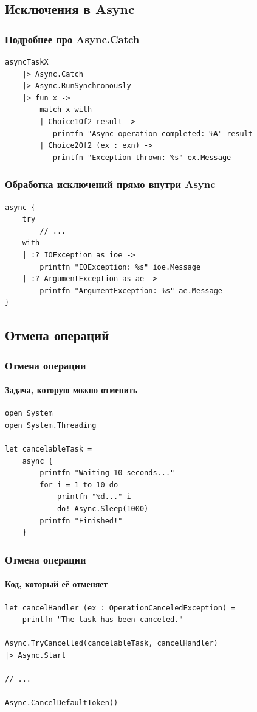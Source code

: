 \documentclass{../../slides-style}
\begin{document}
    \subsection{Исключения в Async}

    \begin{frame}[fragile]
        \frametitle{Подробнее про Async.Catch}
        \begin{verbatim}
asyncTaskX
    |> Async.Catch
    |> Async.RunSynchronously
    |> fun x ->
        match x with
        | Choice1Of2 result -> 
           printfn "Async operation completed: %A" result
        | Choice2Of2 (ex : exn) -> 
           printfn "Exception thrown: %s" ex.Message
        \end{verbatim}
    \end{frame}
    
    \begin{frame}[fragile]
        \frametitle{Обработка исключений прямо внутри Async}
        \begin{verbatim}
async {
    try
        // ...
    with
    | :? IOException as ioe ->
        printfn "IOException: %s" ioe.Message
    | :? ArgumentException as ae ->
        printfn "ArgumentException: %s" ae.Message
}
        \end{verbatim}
    \end{frame}

    \subsection{Отмена операций}

    \begin{frame}[fragile]
        \frametitle{Отмена операции}
        \framesubtitle{Задача, которую можно отменить}
        \begin{verbatim}
open System
open System.Threading

let cancelableTask =
    async {
        printfn "Waiting 10 seconds..."
        for i = 1 to 10 do
            printfn "%d..." i
            do! Async.Sleep(1000)
        printfn "Finished!"
    }
        \end{verbatim}
    \end{frame}

    \begin{frame}[fragile]
        \frametitle{Отмена операции}
        \framesubtitle{Код, который её отменяет}
        \begin{verbatim}
let cancelHandler (ex : OperationCanceledException) =
    printfn "The task has been canceled."

Async.TryCancelled(cancelableTask, cancelHandler)
|> Async.Start

// ...

Async.CancelDefaultToken()
        \end{verbatim}
    \end{frame}
\end{document}

